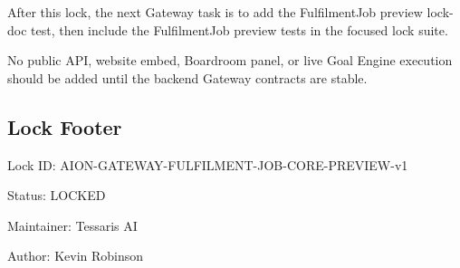 After this lock, the next Gateway task is to add the FulfilmentJob preview lock-doc test, then include the FulfilmentJob preview tests in the focused lock suite.

No public API, website embed, Boardroom panel, or live Goal Engine execution should be added until the backend Gateway contracts are stable.

\subsection{Lock Footer}

Lock ID: AION-GATEWAY-FULFILMENT-JOB-CORE-PREVIEW-v1

Status: LOCKED

Maintainer: Tessaris AI

Author: Kevin Robinson
